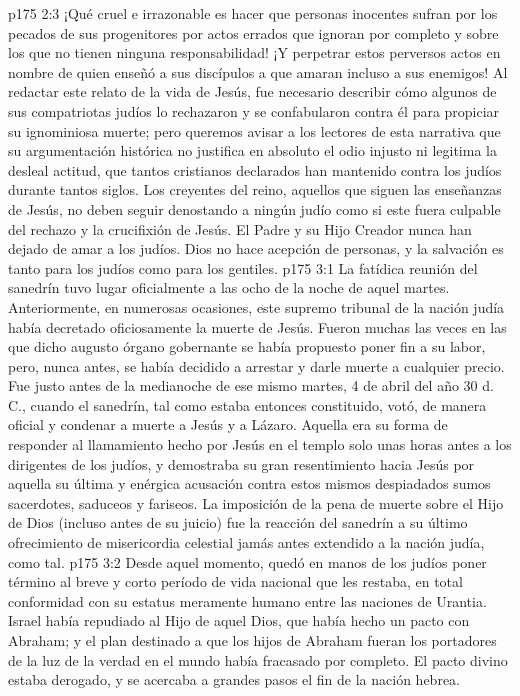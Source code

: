 \vs p175 2:3 ¡Qué cruel e irrazonable es hacer que personas inocentes sufran por los pecados de sus progenitores por actos errados que ignoran por completo y sobre los que no tienen ninguna responsabilidad! ¡Y perpetrar estos perversos actos en nombre de quien enseñó a sus discípulos a que amaran incluso a sus enemigos! Al redactar este relato de la vida de Jesús, fue necesario describir cómo algunos de sus compatriotas judíos lo rechazaron y se confabularon contra él para propiciar su ignominiosa muerte; pero queremos avisar a los lectores de esta narrativa que su argumentación histórica no justifica en absoluto el odio injusto ni legitima la desleal actitud, que tantos cristianos declarados han mantenido contra los judíos durante tantos siglos. Los creyentes del reino, aquellos que siguen las enseñanzas de Jesús, no deben seguir denostando a ningún judío como si este fuera culpable del rechazo y la crucifixión de Jesús. El Padre y su Hijo Creador nunca han dejado de amar a los judíos. Dios no hace acepción de personas, y la salvación es tanto para los judíos como para los gentiles.
\vs p175 3:1 La fatídica reunión del sanedrín tuvo lugar oficialmente a las ocho de la noche de aquel martes. Anteriormente, en numerosas ocasiones, este supremo tribunal de la nación judía había decretado oficiosamente la muerte de Jesús. Fueron muchas las veces en las que dicho augusto órgano gobernante se había propuesto poner fin a su labor, pero, nunca antes, se había decidido a arrestar y darle muerte a cualquier precio. Fue justo antes de la medianoche de ese mismo martes, 4 de abril del año 30 d. C., cuando el sanedrín, tal como estaba entonces constituido, votó, de manera oficial y  condenar a muerte a Jesús y a Lázaro. Aquella era su forma de responder al llamamiento hecho por Jesús en el templo solo unas horas antes a los dirigentes de los judíos, y demostraba su gran resentimiento hacia Jesús por aquella su última y enérgica acusación contra estos mismos despiadados sumos sacerdotes, saduceos y fariseos. La imposición de la pena de muerte sobre el Hijo de Dios (incluso antes de su juicio) fue la reacción del sanedrín a su último ofrecimiento de misericordia celestial jamás antes extendido a la nación judía, como tal.
\vs p175 3:2 Desde aquel momento, quedó en manos de los judíos poner término al breve y corto período de vida nacional que les restaba, en total conformidad con su estatus meramente humano entre las naciones de Urantia. Israel había repudiado al Hijo de aquel Dios, que había hecho un pacto con Abraham; y el plan destinado a que los hijos de Abraham fueran los portadores de la luz de la verdad en el mundo había fracasado por completo. El pacto divino estaba derogado, y se acercaba a grandes pasos el fin de la nación hebrea.
